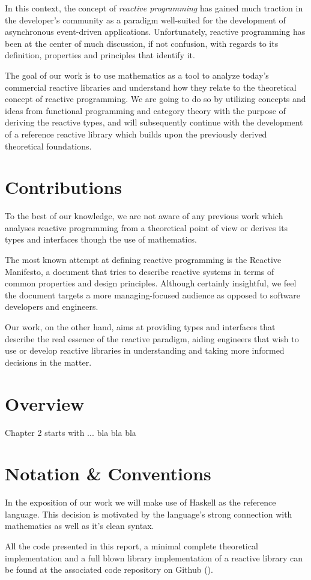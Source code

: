 In this context, the concept of \textit{reactive programming} has gained much traction in the developer's community as a paradigm well-suited for the development of asynchronous  event-driven applications\cite{bainomugisha2013survey}. Unfortunately, reactive programming has been at the center of much discussion, if not confusion, with regards to its definition, properties and principles that identify it\cite{meijer2014reactive}.

The goal of our work is to use mathematics as a tool to analyze today's commercial reactive libraries and understand how they relate to the theoretical concept of reactive programming.  We are going to do so by utilizing concepts and ideas from functional programming and category theory with the purpose of deriving the reactive types, and will subsequently continue with the development of a reference reactive library which builds upon the previously derived theoretical foundations. 

\section*{Contributions}

To the best of our knowledge, we are not aware of any previous work which analyses reactive programming from a theoretical point of view or derives its types and interfaces though the use of mathematics.

The most known attempt at defining reactive programming is the Reactive Manifesto\cite{reactive-manifesto}, a document that tries to describe reactive systems in terms of common properties and design principles. Although certainly insightful, we feel the document targets a more managing-focused audience as opposed to software developers and engineers. 

Our work, on the other hand, aims at providing types and interfaces that describe the real essence of the reactive paradigm, aiding engineers that wish to use or develop reactive libraries in understanding and taking more informed decisions in the matter.

\section*{Overview}

Chapter 2 starts with ... bla bla bla


\section*{Notation \& Conventions}

In the exposition of our work we will make use of Haskell as the reference language. This decision is motivated by the language's strong connection with mathematics as well as it's clean syntax.

All the code presented in this report, a minimal complete theoretical implementation and a full blown library implementation of a reactive library can be found at the associated code repository on Github ().

